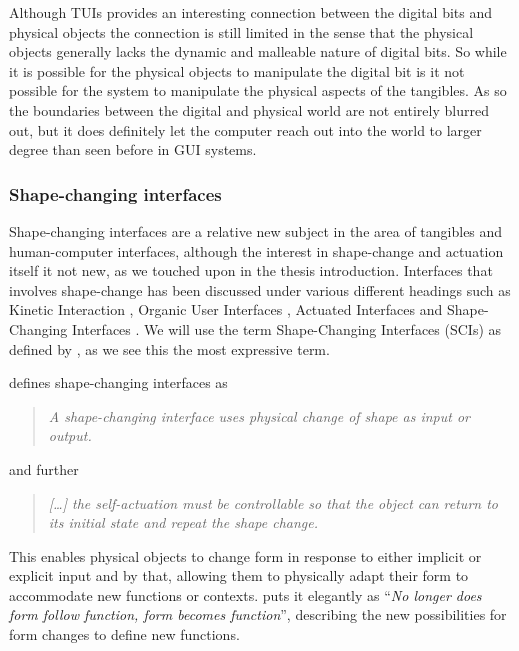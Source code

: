 Although TUIs provides an interesting connection between the digital bits and physical objects the connection is still limited in the sense that the physical objects generally lacks the dynamic and malleable nature of digital bits.
So while it is possible for the physical objects to manipulate the digital bit is it not possible for the system to manipulate the physical aspects of the tangibles.
As so the boundaries between the digital and physical world are not entirely blurred out, but it does definitely let the computer reach out into the world to larger degree than seen before in GUI systems. 

\subsubsection{Shape-changing interfaces}
Shape-changing interfaces are a relative new subject in the area of tangibles and human-computer interfaces, although the interest in shape-change and actuation itself it not new, as we touched upon in the thesis introduction.
Interfaces that involves shape-change has been discussed under various different headings such as Kinetic Interaction \citep{parkes2008designing}, Organic User Interfaces \citep{parkes2008designing,holman2008organic}, Actuated Interfaces \citep{poupyrev2007actuation} and Shape-Changing Interfaces \citep{coelho2011shape,rasmussen2012shape}.
We will use the term Shape-Changing Interfaces (SCIs) as defined by \citeauthor{rasmussen2012shape}, as we see this the most expressive term.

\citeauthor{rasmussen2012shape} defines shape-changing interfaces as
\begin{quotation}
  \emph{A shape-changing interface uses physical change of shape as input or output.}
\end{quotation}
and further
\begin{quotation}
  \emph{[\ldots] the self-actuation must be controllable so that the object can return to its initial state and repeat the shape change. }  
\end{quotation}

This enables physical objects to change form in response to either implicit or explicit input and by that, allowing them to physically adapt their form to accommodate new functions or contexts.
\citep{parkes2008designing} puts it elegantly as ``\emph{No longer does form follow function, form becomes function}'', describing the new possibilities for form changes to define new functions.

